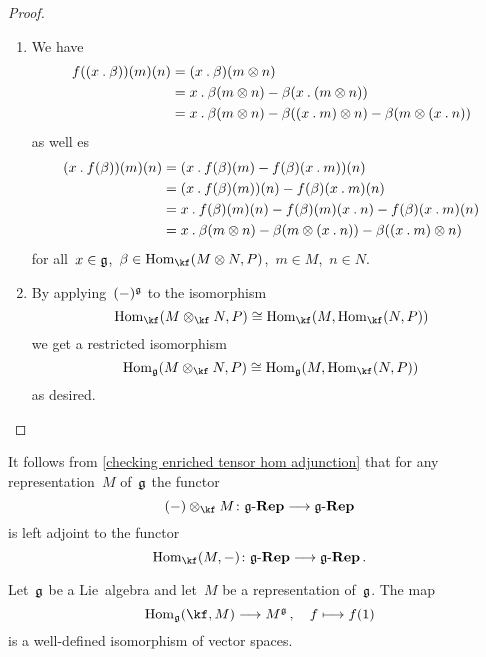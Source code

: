 \begin{proof}
  \leavevmode
  \begin{enumerate}
    \item
      We have
      \begin{align*}
        f( (x \mathbin{.} \beta) )(m)(n)
        &=
        (x \mathbin{.} \beta)(m \otimes n)
        \\
        &=
        x \mathbin{.} \beta(m \otimes n)
        - \beta( x \mathbin{.} (m \otimes n) )
        \\
        &=
        x \mathbin{.} \beta(m \otimes n)
        - \beta( (x \mathbin{.} m) \otimes n )
        - \beta( m \otimes (x \mathbin{.} n) )
      \end{align*}
      as well es
      \begin{align*}
        ( x \mathbin{.} f(\beta) )(m)(n)
        &=
        ( x \mathbin{.} f(\beta)(m) - f(\beta)(x \mathbin{.} m) )(n)
        \\
        &=
        ( x \mathbin{.} f(\beta)(m) )(n)
        - f(\beta)(x \mathbin{.} m)(n)
        \\
        &=
        x \mathbin{.} f(\beta)(m)(n)
        - f(\beta)(m)(x \mathbin{.} n)
        - f(\beta)(x \mathbin{.} m)(n)
        \\
        &=
        x \mathbin{.} \beta(m \otimes n)
        - \beta( m \otimes (x \mathbin{.} n) )
        - \beta( (x \mathbin{.} m) \otimes n )
      \end{align*}
      for all~$x \in \mathfrak{g}$,~$\beta \in \Hom_{\kf}(M \otimes N, P)$,~$m \in M$,~$n \in N$.
    \item
      By applying~$(-)^{\mathfrak{g}}$ to the isomorphism
      \[ 
        \Hom_{\kf}( M \otimes_{\kf} N, P )
        \cong
        \Hom_{\kf}( M, \Hom_{\kf}(N, P) )
      \]
      we get a restricted isomorphism
      \[ 
        \Hom_{\glie}( M \otimes_{\kf} N, P )
        \cong
        \Hom_{\glie}( M, \Hom_{\kf}(N, P) ) \,
      \]
      as desired.
    \qedhere
  \end{enumerate}
\end{proof}


\begin{remark}
  \label{enriched tensor hom adjunction}
  It follows from \cref{checking enriched tensor hom adjunction} that for any representation~$M$ of~$\mathfrak{g}$ the functor
  \[
    (-) \otimes_{\kf} M
    \colon
    \cRep{\glie}
    \to
    \cRep{\glie}
  \]
  is left adjoint to the functor
  \[
    \Hom_{\kf}(M, -)
    \colon
    \cRep{\glie}
    \to
    \cRep{\glie} \,.
  \]
\end{remark}


\begin{corollary}
  \label{invariants via internal hom}
  Let~$\mathfrak{g}$ be a Lie~algebra and let~$M$ be a representation of~$\mathfrak{g}$.
  The map
  \[
    \Hom_{\glie}(\kf, M)
    \to
    M^{\glie} \,,
    \quad
    f
    \mapsto
    f(1)
  \]
  is a well-defined isomorphism of vector spaces.
\end{corollary}


